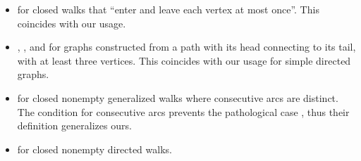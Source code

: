 \begin{remark}
\begin{thmenum}
\begin{itemize}
      \item {} for closed walks that \enquote{enter and leave each vertex at most once}. This coincides with our usage.

      \item {}, ,  and  for graphs constructed from a path with its head connecting to its tail, with at least three vertices. This coincides with our usage for simple directed graphs.

      \item {} for closed nonempty generalized walks where consecutive arcs are distinct. The condition for consecutive arcs prevents the pathological case , thus their definition generalizes ours.

      \item {} for closed nonempty directed walks.
    \end{itemize}
  \end{thmenum}
\end{remark}

